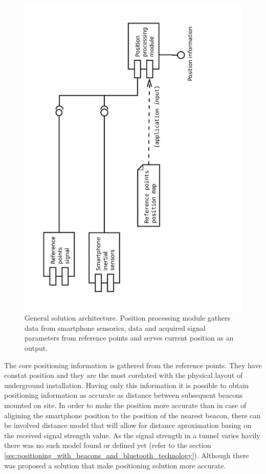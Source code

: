\documentclass[../main.tex]{subfiles}
\begin{document}
\begin{figure}[ht]
\includegraphics[height=\textwidth, angle=270, trim={0 0 4cm 0},clip]{pictures/architecture_general.pdf}
\centering
\caption{General solution architecture. Position processing module gathers data from smartphone sensorics, data and acquired signal parameters from reference points and serves current position as an output.}
\label{fig:architecture_general}
\end{figure}

The core positioning information is gathered from the reference points. They have constat position and they are the most corelated with the physical layout of underground installation. Having only this information it is possible to obtain positioning information as accurate as distance between subsequent beacons mounted on site. In order to make the position more accurate than in case of aligining the smartphone position to the position of the nearest beacon, there can be involved distance model that will allow for distance aproximation basing on the received signal strength value. As the signal strength in a tunnel varies havily there was no such model found or defined yet (refer to the section \ref{sec:positioning_with_beacons_and_bluetooth_technology}). Although there was proposed a solution that make positioning solution more accurate.
\end{document}
